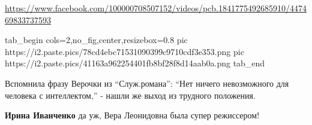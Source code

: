  
 
 
 
 

\url{https://www.facebook.com/100000708507152/videos/pcb.1841775492685910/447469833737593}

\ifcmt
  tab_begin cols=2,no_fig,center,resizebox=0.8
     pic https://i2.paste.pics/78cd4ebc71531090399c9710cdf3e353.png
		 pic https://i2.paste.pics/41163a962254401fb8bf28f8d14aab0a.png
  tab_end
\fi


Вспомнила фразу Верочки из \enquote{Служ.романа}: \enquote{Нет ничего невозможного для
человека с интеллектом,} - нашли же выход из трудного положения.

\textbf{Ирина Иванченко} да уж, Вера Леонидовна была супер режиссером!
